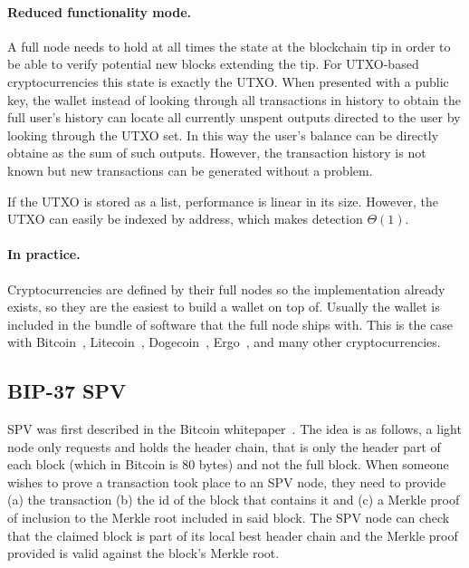 \paragraph{Reduced functionality mode.}
A full node needs to hold at all times the state at the blockchain tip in order to be able to verify potential new blocks extending the tip. For UTXO-based cryptocurrencies this state is exactly the UTXO. When presented with a public key, the wallet instead of looking through all transactions in history to obtain the full user's history can locate all currently unspent outputs directed to the user by looking through the UTXO set. In this way the user's balance can be directly obtaine as the sum of such outputs. However, the transaction history is not known but new transactions can be generated without a problem.

If the UTXO is stored as a list, performance is linear in its size. However, the UTXO can easily be indexed by address, which makes detection $\Theta(1)$.

\paragraph{In practice.}
Cryptocurrencies are defined by their full nodes so the implementation already exists, so they are the easiest to build a wallet on top of. Usually the wallet is included in the bundle of software that the full node ships with. This is the case with Bitcoin~\cite{bitcoin}, Litecoin~\cite{litecoin}, Dogecoin~\cite{dogecoin}, Ergo~\cite{ergo}, and many other cryptocurrencies.

\subsection{BIP-37 SPV}
SPV was first described in the Bitcoin whitepaper~\cite{bitcoin}.
The idea is as follows, a light node only requests and holds the header chain, that is only the header part of each block (which in Bitcoin is 80 bytes) and not the full block. When someone wishes to prove a transaction took place to an SPV node, they need to provide (a) the transaction (b) the id of the block that contains it and (c) a Merkle proof of inclusion to the Merkle root included in said block. The SPV node can check that the claimed block is part of its local best header chain and the Merkle proof provided is valid against the block's Merkle root.

